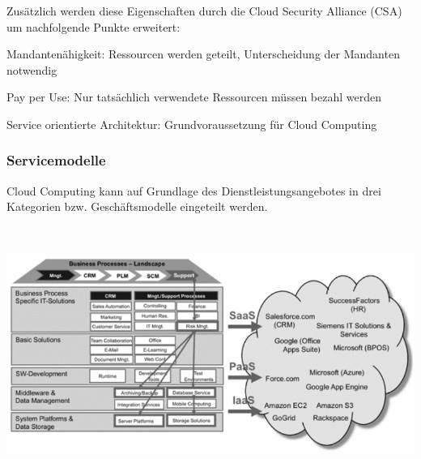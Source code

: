 \documentclass[12pt,a4paper,bibliography=totocnumbered,listof=totocnumbered]{scrartcl}
\begin{document}
Zusätzlich werden diese Eigenschaften durch die Cloud Security Alliance (CSA) \cite{36} um nachfolgende Punkte erweitert:
\begin{compactitem}
	\item Mandantenähigkeit: Ressourcen werden geteilt, Unterscheidung der Mandanten notwendig
	\item Pay per Use: Nur tatsächlich verwendete Ressourcen müssen bezahl werden
	\item Service orientierte Architektur: Grundvoraussetzung für Cloud Computing
\end{compactitem}

\subsubsection{Servicemodelle}
Cloud Computing kann auf Grundlage des Dienstleistungsangebotes in drei Kategorien bzw. Geschäftsmodelle \cite{34} eingeteilt werden.

\vspace{1em}
$\;$\\
\begin{minipage}{\linewidth}
	\centering
	\includegraphics[width=1.0\linewidth]{IaaS_Modelle.png}
\end{minipage}
\vspace{1em}
\end{document}
